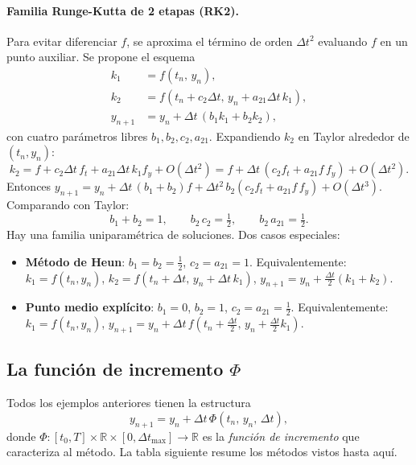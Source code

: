 \documentclass[a4paper,11pt]{report}
\begin{document}
\paragraph{Familia Runge-Kutta de 2 etapas (RK2).}
Para evitar diferenciar $f$, se aproxima el término de orden $\Delta t^2$ evaluando $f$ en un punto auxiliar. Se propone el esquema
\begin{align*}
  k_1&=f(t_n,\,y_n),\\
  k_2&=f(t_n+c_2\Delta t,\,y_n+a_{21}\Delta t\,k_1),\\
  y_{n+1}&=y_n+\Delta t\,(b_1k_1+b_2k_2),
\end{align*}
con cuatro parámetros libres $b_1,b_2,c_2,a_{21}$. Expandiendo $k_2$ en Taylor alrededor de $(t_n,y_n)$:
\[
  k_2 = f + c_2\Delta t\,f_t + a_{21}\Delta t\,k_1 f_y + O(\Delta t^2) = f + \Delta t\,(c_2 f_t + a_{21} f\,f_y)+O(\Delta t^2).
\]
Entonces $y_{n+1}=y_n+\Delta t\,(b_1+b_2)f+\Delta t^2\,b_2(c_2 f_t+a_{21}f\,f_y)+O(\Delta t^3)$. Comparando con Taylor:
\[
  b_1+b_2=1,\qquad b_2\,c_2=\tfrac{1}{2},\qquad b_2\,a_{21}=\tfrac{1}{2}.
\]
Hay una familia uniparamétrica de soluciones. Dos casos especiales:
\begin{itemize}
  \item \textbf{Método de Heun}: $b_1=b_2=\tfrac{1}{2}$, $c_2=a_{21}=1$.
  Equivalentemente: $k_1=f(t_n,y_n)$, $k_2=f(t_n+\Delta t,\,y_n+\Delta t\,k_1)$, $y_{n+1}=y_n+\tfrac{\Delta t}{2}(k_1+k_2)$.
  \item \textbf{Punto medio explícito}: $b_1=0$, $b_2=1$, $c_2=a_{21}=\tfrac{1}{2}$.
  Equivalentemente: $k_1=f(t_n,y_n)$, $y_{n+1}=y_n+\Delta t\,f(t_n+\tfrac{\Delta t}{2},\,y_n+\tfrac{\Delta t}{2}k_1)$.
\end{itemize}

\subsection{La función de incremento $\Phi$}

Todos los ejemplos anteriores tienen la estructura
\begin{equation}\label{eq:one_step_general}
  y_{n+1} = y_n + \Delta t\,\Phi(t_n,\,y_n,\,\Delta t),
\end{equation}
donde $\Phi:[t_0,T]\times\mathbb{R}\times[0,\Delta t_{\max}]\to\mathbb{R}$ es la \emph{función de incremento} que caracteriza al método. La tabla siguiente resume los métodos vistos hasta aquí.
\end{document}
